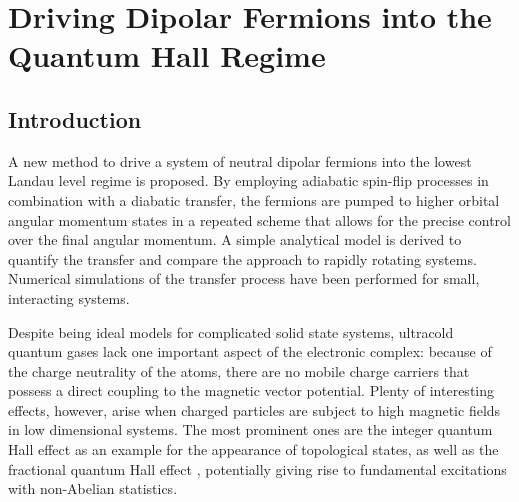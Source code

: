 

\newcommand{\Ef}{E_\text{F}}
\newcommand{\up}{\uparrow}
\newcommand{\down}{\downarrow}
\newcommand{\liqhe}{L^{\star}}
\newcommand{\dl}[1]{{\hat #1}}
\newcommand{\dlCdd}{\dl{C}_\text{dd}}
\newcommand{\dlEf}{\dl{E}_\text{F}}
\newcommand{\dlliqhe}{\dl{L}^{\star}}
\newcommand{\Vdd}{\ensuremath{V_\text{dd}}\xspace}
\newcommand{\Cdd}{\ensuremath{C_\text{dd}}\xspace}


\chapter{Driving Dipolar Fermions into the Quantum Hall Regime}

\section{Introduction}

A new method to drive a system of neutral dipolar fermions into the lowest Landau level regime is proposed.
By employing adiabatic spin-flip processes in combination with a diabatic transfer, the fermions are pumped to higher orbital angular momentum states in a repeated scheme that allows for the precise control over the final angular momentum.
A simple analytical model is derived to quantify the transfer and compare the approach to rapidly rotating systems.
Numerical simulations of the transfer process have been performed for small, interacting systems.


Despite being ideal models for complicated solid state systems, ultracold quantum gases lack one important aspect of the electronic complex: because of the charge neutrality of the atoms, there are no mobile charge carriers that possess a direct coupling to the magnetic vector potential. Plenty of interesting effects, however, arise when charged particles are subject to high magnetic fields in low dimensional systems. The most prominent ones are the integer quantum Hall effect \cite{Klitzing1980} as an example for the appearance of topological states, as well as the fractional quantum Hall effect \cite{Laughlin1983}, potentially giving rise to fundamental excitations with non-Abelian statistics.

